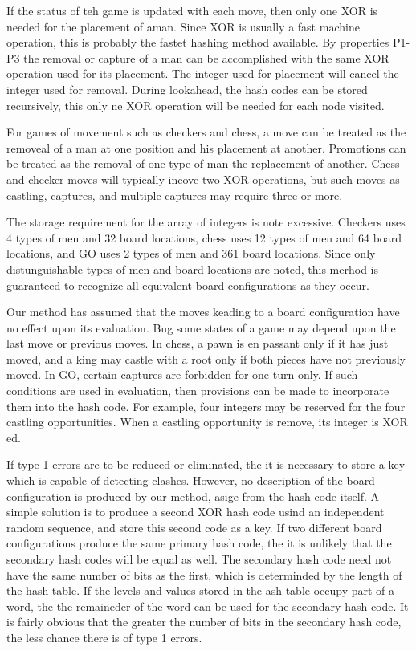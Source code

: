 \documentclass{article}
\begin{document}
If the status of teh game is updated with each move, then only one XOR is
needed for the placement of aman. Since XOR is usually a fast machine
operation, this is probably the fastet hashing method available. By properties
P1-P3 the removal or capture of a man can be accomplished with the same XOR
operation used for its placement. The integer used for placement will cancel
the integer used for removal. During lookahead, the hash codes can be stored
recursively, this only ne XOR operation will be needed for each node visited.

For games of movement such as checkers and chess, a move can be treated as the
removeal of a man at one position and his placement at another. Promotions can
be treated as the removal of one type of man the replacement of another. Chess
and checker moves will typically incove two XOR operations, but such moves as
castling, captures, and multiple captures may require three or more.

The storage requirement for the array of integers is note excessive. Checkers
uses 4 types of men and 32 board locations, chess uses 12 types of men and 64
board locations, and GO uses 2 types of men and 361 board locations. Since only
distunguishable types of men and board locations are noted, this merhod is
guaranteed to recognize all equivalent board configurations as they occur.

Our method has assumed that the moves keading to a board configuration have no
effect upon its evaluation. Bug some states of a game may depend upon the last
move or previous moves. In chess, a pawn is en passant only if it has just
moved, and a king may castle with a root only if both pieces have not
previously moved. In GO, certain captures are forbidden for one turn only. If
such conditions are used in evaluation, then provisions can be made to
incorporate them into the hash code. For example, four integers may be reserved for the four castling opportunities. When a castling opportunity is remove, its integer is XOR ed.

If type 1 errors are to be reduced or eliminated, the it is necessary to store
a key which is capable of detecting clashes. However, no description of the
board configuration is produced by our method, asige from the hash code itself.
A simple solution is to produce a second XOR hash code usind an independent
random sequence, and store this second code as a key. If two different board
configurations produce the same primary hash code, the it is unlikely that the
secondary hash codes will be equal as well. The secondary hash code need not
have the same number of bits as the first, which is determinded by the length
of the hash table. If the levels and values stored in the ash table occupy part
of a word, the the remaineder of the word can be used for the secondary hash
code. It is fairly obvious that the greater the number of bits in the secondary
hash code, the less chance there is of type 1 errors.
\end{document}
